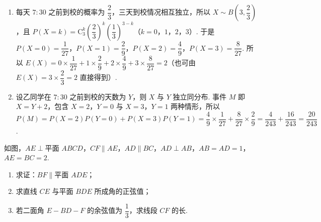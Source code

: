 \begin{solution}
\begin{enumerate}
\item 每天 \(7{:}30\) 之前到校的概率为 \(\dfrac23\)，三天到校情况相互独立，所以 \(X\sim B\left(3,\dfrac23\right)\)，且 \(P(X=k)=\mathrm C_3^k\left(\dfrac23\right)^k\left(\dfrac13\right)^{3-k}\)（\(k=0\)，\(1\)，\(2\)，\(3\)）. 于是 \(P(X=0)=\dfrac1{27}\)，\(P(X=1)=\dfrac29\)，\(P(X=2)=\dfrac49\)，\(P(X=3)=\dfrac8{27}\). 所以 \(E(X)=0\times\dfrac1{27}+1\times\dfrac29+2\times\dfrac49+3\times\dfrac8{27}=2\)（也可由 \(E(X)=3\times\dfrac23=2\) 直接得到）.
\item 设乙同学在 \(7{:}30\) 之前到校的天数为 \(Y\)，则 \(X\) 与 \(Y\) 独立同分布. 事件 \(M\) 即 \(X=Y+2\)，包含 \(X=2\)，\(Y=0\) 与 \(X=3\)，\(Y=1\) 两种情形，所以 \(P(M)=P(X=2)P(Y=0)+P(X=3)P(Y=1)=\dfrac49\times\dfrac1{27}+\dfrac8{27}\times\dfrac29=\dfrac4{243}+\dfrac{16}{243}=\dfrac{20}{243}\).
\end{enumerate}
\end{solution}


\begin{problem}
如图，\( AE\perp \)平面 \(ABCD\)，\( CF\parallel AE \)，\( AD\parallel BC \)，\( AD\perp AB \)，\( AB=AD=1 \)，\( AE=BC=2 \).

\begin{enumerate}
\item 求证：\( BF\parallel \)平面 \(ADE\)；
\item 求直线 \(CE\) 与平面 \(BDE\) 所成角的正弦值；
\item 若二面角 \( E-BD-F \) 的余弦值为 \( \dfrac{1}{3} \)，求线段 \(CF\) 的长.
\end{enumerate}

\begingroup
{}
\endgroup
\FloatBarrier
\end{problem}


